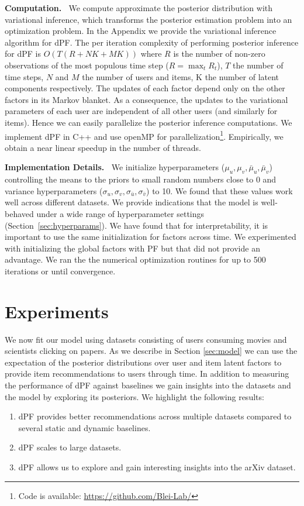 \documentclass{sig-alternate}
\newcommand{\mypar}[1]{\vspace{0.1in}\noindent \textbf{#1 \,}}
\begin{document}
\mypar{Computation.} \noindent
We compute approximate the posterior distribution with variational inference, which
transforms the posterior estimation problem into an optimization problem. In the 
Appendix we provide the variational inference algorithm for dPF.
The per iteration complexity of
performing posterior inference for dPF is $O(T(R + NK + MK))$ where $R$ is the
number of non-zero observations of the most populous time step ($R=\max_t
R_t$), $T$ the number of time steps, $N$ and $M$ the number of users and items, K the number of latent components
respectively. The updates of each factor depend only on the other factors in its Markov blanket.
As a consequence, the updates to the variational parameters of
each user are independent of all other users (and similarly for items).
Hence we can easily parallelize the posterior inference computations.
We implement dPF in C++ and use openMP for parallelization\footnote{Code
is available: \url{https://github.com/Blei-Lab/}}. Empirically, we obtain a
near linear speedup in the number of threads. 

\mypar{Implementation Details.} \noindent We initialize hyperparameters 
($\mu_u,\mu_v,\bar{\mu}_u,\bar{\mu}_v$) controlling the means to the priors to small random numbers close to 0 and
variance hyperparameters
($\sigma_u,\sigma_v,\sigma_{\bar{u}},\sigma_{\bar{v}}$) to 10. We found that
these values work well across different datasets. We provide indications that
the model is well-behaved under a wide range of hyperparameter settings
(Section~\ref{sec:hyperparams}). We have found that for interpretability, it is
important to use the same initialization for factors across time. We
experimented with initializing the global factors with PF but that did not
provide an advantage. We ran the the numerical optimization routines for up to
500 iterations or until convergence. 
 \section{Experiments}\label{sec:experiments}

\noindent
We now fit our model using datasets consisting of users consuming movies and
scientists clicking on papers. As we describe in Section \ref{sec:model} we can
use the expectation of the posterior distributions over user and item latent
factors to provide item recommendations to users through time. In addition to
measuring the performance of dPF against baselines we gain insights into the
datasets and the model by exploring its posteriors. We highlight the following
results:
\begin{enumerate}
\item dPF provides better recommendations across multiple datasets compared to
several static and dynamic baselines.
\item dPF scales to large datasets.
\item dPF allows us to explore and gain interesting insights into the arXiv
dataset. 
\end{enumerate}
\end{document}
